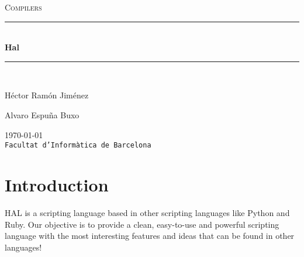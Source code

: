 \documentclass[a4paper,11pt]{article}
\begin{document}
\begin{titlepage}
\begin{center}
\textsc{\Large Compilers}
\\[1.5cm]
\rule{\linewidth}{0.5mm}
\\[0.4cm]
{\huge
\bfseries
Hal
\\[0.4cm]
}
\rule{\linewidth}{0.5mm}
\\[2.5cm]
\begin{minipage}{0.4\textwidth}
\begin{flushleft}
\large
Héctor Ramón Jiménez
\end{flushleft}
\end{minipage}
\begin{minipage}{0.4\textwidth}
\begin{flushright}
\large
Alvaro Espuña Buxo
\end{flushright}
\end{minipage}
\vfill
{\large
\today
}
\\
{\large
\texttt{Facultat d'Informàtica de Barcelona}
}
\end{center}
\end{titlepage}
\section{Introduction}
HAL is a scripting language based in other scripting languages like Python and Ruby.
    Our objective is to provide a clean, easy-to-use and powerful scripting language with the
    most interesting features and ideas that can be found in other languages!
\end{document}
